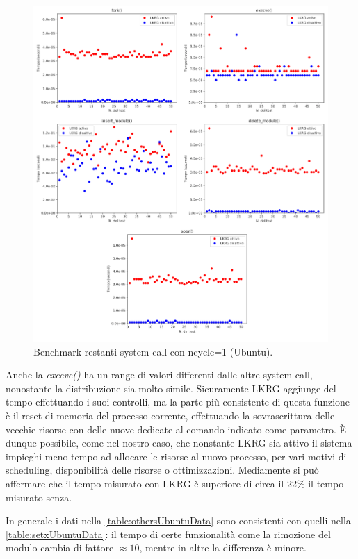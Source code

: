 \begin{figure}[!ht]
\centering
\includegraphics[scale=1.3]{Figures/Ubuntu/SingleOthers}
\caption[Benchmark restanti system call con ncycle=1 (Ubuntu)]{Benchmark restanti system call con ncycle=1 (Ubuntu).}
\label{fig:othersUbuntuFig}
\end{figure}

Anche la \emph{execve()} ha un range di valori differenti dalle altre system call, nonostante la distribuzione sia molto simile. Sicuramente LKRG aggiunge del tempo effettuando i suoi controlli, ma la parte più consistente di questa funzione è il reset di memoria del processo corrente, effettuando la sovrascrittura delle vecchie risorse con delle nuove dedicate al comando indicato come parametro. È dunque possibile, come nel nostro caso, che nonstante LKRG sia attivo il sistema impieghi meno tempo ad allocare le risorse al nuovo processo, per vari motivi di scheduling, disponibilità delle risorse o ottimizzazioni. Mediamente si può affermare che il tempo misurato con LKRG è superiore di circa il 22\% il tempo misurato senza.

In generale i dati nella \autoref{table:othersUbuntuData} sono consistenti con quelli nella \autoref{table:setxUbuntuData}: il tempo di certe funzionalità come la rimozione del modulo cambia di fattore $\approx 10$, mentre in altre la differenza è minore.
\\\par

